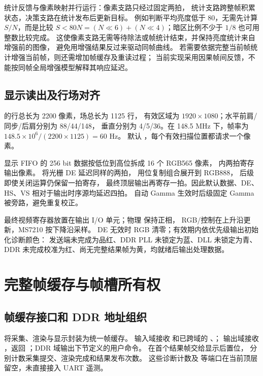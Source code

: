 统计反馈与像素映射并行运行：像素支路只经过固定两拍，
统计支路跨整帧积累状态，决策支路在统计发布后更新目标。
例如判断平均亮度低于 80，无需先计算 $S/N$，而是比较
$S<80N=(N\ll6)+(N\ll4)$；暗区比例不少于 $1/8$ 也可用整数比较完成。
这使像素支路无需等待除法或帧统计结束，并保持亮度统计来自增强前的图像，
避免用增强结果反过来驱动同帧曲线。
若需要依据完整当前帧统计增强当前帧，则还需增加帧缓存及重读过程；
当前实现采用因果帧间反馈，不能按同帧全局增强模型解释其响应延迟。

\subsection{显示读出及行场对齐}
 的行总长为 2200 像素，场总长为 1125 行，
有效区域为 $1920\times1080$；水平前肩/同步/后肩分别为 88/44/148，
垂直分别为 4/5/36。在 148.5 MHz 下，帧率为
$148.5\times10^6/(2200\times1125)=60$ Hz。
默认 ，每个有效扫描位置都请求一个像素。

显示 FIFO 的 256 bit 数据按低位到高位拆成 16 个 RGB565 像素，
 内两拍寄存输出像素。
 将光栅 DE 延迟同样的两拍，
 用位复制组合展开到 RGB888，
后级  即使关闭运算仍保留一拍寄存，
最终顶层输出再寄存一拍。因此默认数据、DE、HS、VS 相对于输出时序源均延迟四拍。
自动 Gamma 生效时后级固定 Gamma 被旁路，避免重复校正。

最终视频寄存器放置在输出 I/O 单元；物理  保持正相，
RGB/控制在上升沿更新，MS7210 按下降沿采样。
DE 无效时 RGB 清零；有效期内依优先级输出初始化诊断颜色：
发送端未完成为品红、DDR PLL 未锁定为蓝、DLL 未锁定为青、
DDR 未完成校准为红、尚无完整结果帧为黄，均就绪后输出处理数据。

\section{完整帧缓存与帧槽所有权}
\subsection{帧缓存接口和 DDR 地址组织}
 将采集、渲染与显示封装为统一帧缓存。
输入域接收  和已跨域的
、；
输出域接收 ，返回
；DDR 域输出下节定义的用户命令。
 在首个结果帧交给显示后置位，
 分别计数采集提交、渲染完成和结果发布次数。
这些诊断计数及  等端口在当前顶层留空，未直接接入 UART 遥测。

